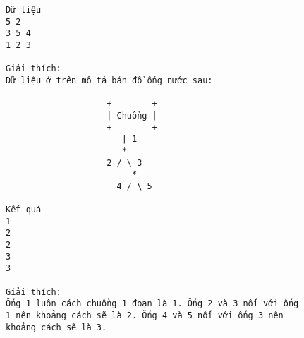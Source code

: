\begin{verbatim}
Dữ liệu
5 2
3 5 4
1 2 3

Giải thích:
Dữ liệu ở trên mô tả bản đồ ống nước sau:

                    +--------+
                    | Chuồng |
                    +--------+
                       | 1
                       *
                    2 / \ 3
                         *
                      4 / \ 5

Kết quả
1
2
2
3
3

Giải thích:
Ống 1 luôn cách chuồng 1 đoạn là 1. Ống 2 và 3 nối với ống 
1 nên khoảng cách sẽ là 2. Ống 4 và 5 nối với ống 3 nên 
khoảng cách sẽ là 3.
\end{verbatim}